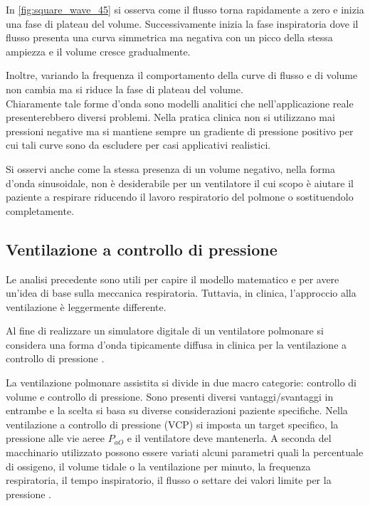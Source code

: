 In \cref{fig:square_wave_45} si osserva come il flusso torna rapidamente a zero e inizia una fase di plateau del volume. Successivamente inizia la fase inspiratoria dove il flusso presenta una curva simmetrica ma negativa con un picco della stessa ampiezza e il volume cresce gradualmente. 

Inoltre, variando la frequenza il comportamento della curve di flusso e di volume non cambia ma si riduce la fase di plateau del volume. 
\\

Chiaramente tale forme d'onda sono modelli analitici che nell'applicazione reale presenterebbero diversi problemi. Nella pratica clinica non si utilizzano mai pressioni negative ma si mantiene sempre un gradiente di pressione positivo per cui tali curve sono da escludere per casi applicativi realistici. 

Si osservi anche come la stessa presenza di un volume negativo, nella forma d'onda sinusoidale, non è desiderabile per un ventilatore il cui scopo è aiutare il paziente a respirare riducendo il lavoro respiratorio del polmone o sostituendolo completamente.

\subsection{Ventilazione a controllo di pressione}

Le analisi precedente sono utili per capire il modello matematico e per avere un'idea di base sulla meccanica respiratoria. Tuttavia, in clinica, l'approccio alla ventilazione è leggermente differente. 

Al fine di realizzare un simulatore digitale di un ventilatore polmonare si considera una forma d'onda tipicamente diffusa in clinica per la ventilazione a controllo di pressione \cite{al-naggar_modelling_2015}. 

La ventilazione polmonare assistita si divide in due macro categorie: controllo di volume e controllo di pressione. Sono presenti diversi vantaggi/svantaggi in entrambe e la scelta si basa su diverse considerazioni paziente specifiche. Nella ventilazione a controllo di pressione (VCP) si imposta un target specifico, la pressione alle vie aeree $P_{aO}$ e il ventilatore deve mantenerla. A seconda del macchinario utilizzato possono essere variati alcuni parametri quali la percentuale di ossigeno, il volume tidale o la ventilazione per minuto, la frequenza respiratoria, il tempo inspiratorio, il flusso o settare dei valori limite per la pressione \cite{grossbach_overview_2011}.

